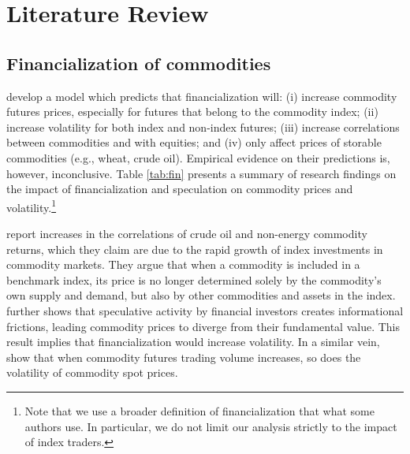 \section{Literature Review}
\subsection{Financialization of commodities}
 \citet{basak2016model} develop a model which predicts that financialization will: (i) increase commodity futures prices, especially for futures that belong to the commodity index; (ii) increase volatility for both index and non-index futures; (iii) increase correlations between commodities and with equities; and (iv) only affect prices of storable commodities (e.g., wheat, crude oil).  Empirical evidence on their predictions is, however, inconclusive. Table \ref{tab:fin} presents a summary of research findings on the impact of financialization and speculation on commodity prices and volatility.\footnote{Note that we use a broader definition of financialization that what some authors use. In particular, we do not limit our analysis strictly to the impact of index traders.}   

  \citet{tang2012index} report increases in the correlations of crude oil and non-energy commodity returns, which they claim are due to the rapid growth of index investments in commodity markets. They argue that when a commodity is included in a benchmark index, its price is no longer determined solely by the commodity's own supply and demand, but also by other commodities and assets in the index.   \citet{singleton2014investor} further shows that speculative activity by financial investors creates informational frictions, leading commodity prices to diverge from their fundamental value. This result implies that financialization would increase volatility. In a similar vein, \citet*{yang2005futures} show that when commodity futures trading volume increases, so does the volatility of commodity spot prices. 



